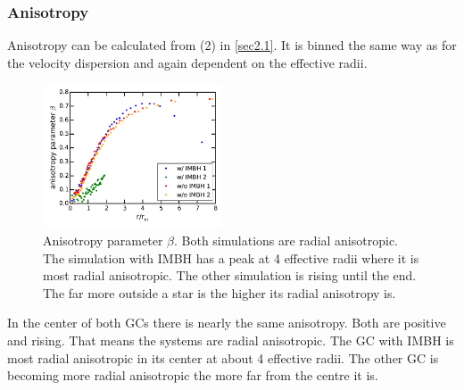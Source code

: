 \documentclass[a4paper,12pt,abstracton]{scrartcl}
\begin{document}
\subsubsection{Anisotropy}
Anisotropy can be calculated from (2) in \ref{sec2.1}. It is binned the same way as for the velocity dispersion and again dependent on the effective radii.
\begin{figure}
	\centering
	\includegraphics[width=0.475\textwidth]{Plots/anisotropy_parameter_beta.pdf}
	\caption{Anisotropy parameter \(\beta\). Both simulations are radial anisotropic. The simulation with \ac{IMBH} has a peak at 4 effective radii where it is most radial anisotropic. The other simulation is rising until the end. The far more outside a star is the higher its radial anisotropy is.}
	\label{fig:anisotropy_param}
\end{figure}
In the center of both \ac{GCs} there is nearly the same anisotropy. Both are positive and rising. That means the systems are radial anisotropic. The \ac{GC} with \ac{IMBH} is most radial anisotropic in its center at about 4 effective radii. The other \ac{GC} is becoming more radial anisotropic the more far from the centre it is.
\end{document}
